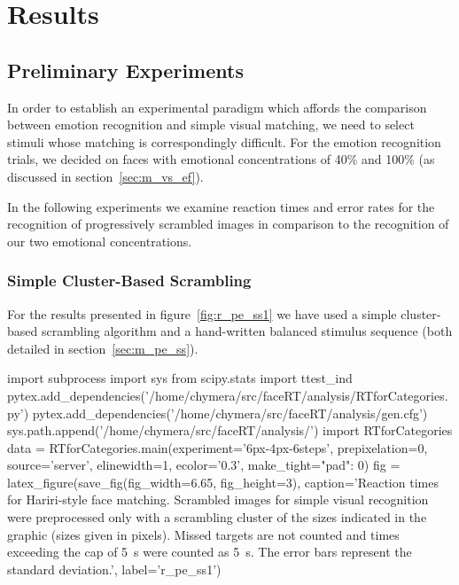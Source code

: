 \chapter{Results}
    \section{Preliminary Experiments}\label{sec:r_pe}
	In order to establish an experimental paradigm which affords the comparison between emotion recognition and simple visual matching, we need to select stimuli whose matching is correspondingly difficult.
	For the emotion recognition trials, we decided on faces with emotional concentrations of 40\% and 100\% (as discussed in section~\ref{sec:m_vs_ef}).
	
	In the following experiments we examine reaction times and error rates for the recognition of progressively scrambled images in comparison to the recognition of our two emotional concentrations.
	\subsection{Simple Cluster-Based Scrambling}\label{sec:r_pe_ss}
	    For the results presented in figure~\ref{fig:r_pe_ss1} we have used a simple cluster-based scrambling algorithm and a hand-written balanced stimulus sequence 
	    (both detailed in section~\ref{sec:m_pe_ss}).
	    \begin{pycode}
		import subprocess
		import sys
		from scipy.stats import ttest_ind
		pytex.add_dependencies('/home/chymera/src/faceRT/analysis/RTforCategories.py')
		pytex.add_dependencies('/home/chymera/src/faceRT/analysis/gen.cfg')
		sys.path.append('/home/chymera/src/faceRT/analysis/')
		import RTforCategories
		data = RTforCategories.main(experiment='6px-4px-6steps', prepixelation=0, source='server', elinewidth=1, ecolor='0.3', make_tight={"pad": 0})
		fig = latex_figure(save_fig(fig_width=6.65, fig_height=3), caption='Reaction times for Hariri-style face matching. Scrambled images for simple visual recognition were preprocessed only with a scrambling cluster of the sizes indicated in the graphic (sizes given in pixels). Missed targets are not counted and times exceeding the cap of \SI{5}{\second} were counted as \SI{5}{\second}. The error bars represent the standard deviation.', label='r_pe_ss1')
	    \end{pycode}
	    
